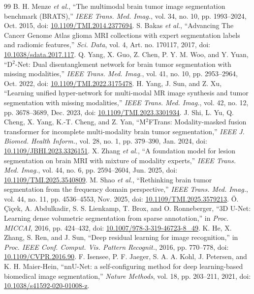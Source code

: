 \documentclass[conference]{IEEEtran}
\begin{document}
\begin{thebibliography}{99}
 B. H. Menze \emph{et al.}, ``The multimodal brain tumor image segmentation benchmark (BRATS),'' \emph{IEEE Trans. Med. Imag.}, vol. 34, no. 10, pp. 1993--2024, Oct. 2015, doi: \url{10.1109/TMI.2014.2377694}.
 S. Bakas \emph{et al.}, ``Advancing The Cancer Genome Atlas glioma MRI collections with expert segmentation labels and radiomic features,'' \emph{Sci. Data}, vol. 4, Art. no. 170117, 2017, doi: \url{10.1038/sdata.2017.117}.
 Q. Yang, X. Guo, Z. Chen, P. Y. M. Woo, and Y. Yuan, ``D$^2$-Net: Dual disentanglement network for brain tumor segmentation with missing modalities,'' \emph{IEEE Trans. Med. Imag.}, vol. 41, no. 10, pp. 2953--2964, Oct. 2022, doi: \url{10.1109/TMI.2022.3175478}.
 H. Yang, J. Sun, and Z. Xu, ``Learning unified hyper-network for multi-modal MR image synthesis and tumor segmentation with missing modalities,'' \emph{IEEE Trans. Med. Imag.}, vol. 42, no. 12, pp. 3678--3689, Dec. 2023, doi: \url{10.1109/TMI.2023.3301934}.
 J. Shi, L. Yu, Q. Cheng, X. Yang, K.-T. Cheng, and Z. Yan, ``M$^2$FTrans: Modality-masked fusion transformer for incomplete multi-modality brain tumor segmentation,'' \emph{IEEE J. Biomed. Health Inform.}, vol. 28, no. 1, pp. 379--390, Jan. 2024, doi: \url{10.1109/JBHI.2023.3326151}.
 X. Zhang \emph{et al.}, ``A foundation model for lesion segmentation on brain MRI with mixture of modality experts,'' \emph{IEEE Trans. Med. Imag.}, vol. 44, no. 6, pp. 2594--2604, Jun. 2025, doi: \url{10.1109/TMI.2025.3540809}.
 M. Shao \emph{et al.}, ``Rethinking brain tumor segmentation from the frequency domain perspective,'' \emph{IEEE Trans. Med. Imag.}, vol. 44, no. 11, pp. 4536--4553, Nov. 2025, doi: \url{10.1109/TMI.2025.3579213}.
 \"O. \c{C}i\c{c}ek, A. Abdulkadir, S. S. Lienkamp, T. Brox, and O. Ronneberger, ``3D U-Net: Learning dense volumetric segmentation from sparse annotation,'' in \emph{Proc. MICCAI}, 2016, pp. 424--432, doi: \url{10.1007/978-3-319-46723-8_49}.
 K. He, X. Zhang, S. Ren, and J. Sun, ``Deep residual learning for image recognition,'' in \emph{Proc. IEEE Conf. Comput. Vis. Pattern Recognit.}, 2016, pp. 770--778, doi: \url{10.1109/CVPR.2016.90}.
 F. Isensee, P. F. Jaeger, S. A. A. Kohl, J. Petersen, and K. H. Maier-Hein, ``nnU-Net: a self-configuring method for deep learning-based biomedical image segmentation,'' \emph{Nature Methods}, vol. 18, pp. 203--211, 2021, doi: \url{10.1038/s41592-020-01008-z}.

\end{thebibliography}
\end{document}
